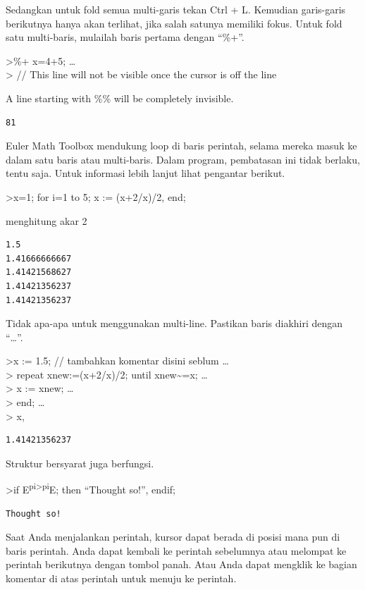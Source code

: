 \documentclass[
]{book}
\begin{document}
Sedangkan untuk fold semua multi-garis tekan Ctrl + L. Kemudian garis-garis berikutnya hanya akan terlihat, jika salah satunya memiliki fokus. Untuk fold satu multi-baris, mulailah baris pertama dengan ``\%+''.

\textgreater\%+ x=4+5; \ldots{}\\
\textgreater{} // This line will not be visible once the cursor is off the line

A line starting with \%\% will be completely invisible.

\begin{verbatim}
81
\end{verbatim}

Euler Math Toolbox mendukung loop di baris perintah, selama mereka masuk ke dalam satu baris atau multi-baris. Dalam program, pembatasan ini tidak berlaku, tentu saja. Untuk informasi lebih lanjut lihat pengantar berikut.

\textgreater x=1; for i=1 to 5; x := (x+2/x)/2, end;

menghitung akar 2

\begin{verbatim}
1.5
1.41666666667
1.41421568627
1.41421356237
1.41421356237
\end{verbatim}

Tidak apa-apa untuk menggunakan multi-line. Pastikan baris diakhiri dengan ``\ldots{}''.

\textgreater x := 1.5; // tambahkan komentar disini seblum \ldots{}\\
\textgreater{} repeat xnew:=(x+2/x)/2; until xnew\textasciitilde=x; \ldots{}\\
\textgreater{} x := xnew; \ldots{}\\
\textgreater{} end; \ldots{}\\
\textgreater{} x,

\begin{verbatim}
1.41421356237
\end{verbatim}

Struktur bersyarat juga berfungsi.

\textgreater if E\textsuperscript{pi\textgreater pi}E; then ``Thought so!'', endif;

\begin{verbatim}
Thought so!
\end{verbatim}

Saat Anda menjalankan perintah, kursor dapat berada di posisi mana pun di baris perintah. Anda dapat kembali ke perintah sebelumnya atau melompat ke perintah berikutnya dengan tombol panah. Atau Anda dapat mengklik ke bagian komentar di atas perintah untuk menuju ke perintah.
\end{document}
